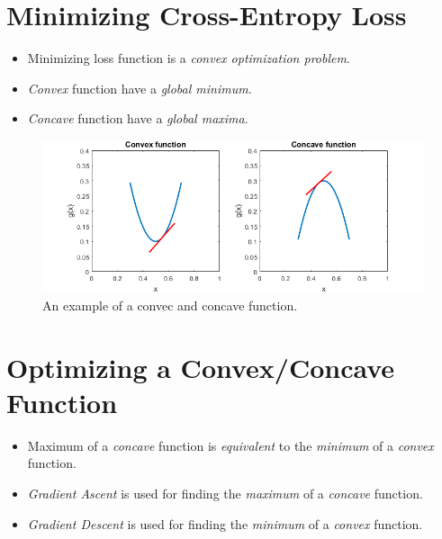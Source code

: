 \documentclass[
	number={4},
	title={Logistic Regression}
]{cs584notes}
\begin{document}
\section{Minimizing Cross-Entropy Loss}\label{sec:minimizing-cross-entropy-loss}
\begin{itemize}
	\item Minimizing loss function  is a \emph{convex optimization problem}.
	\item \emph{Convex } function have a \emph{global minimum}.
	\item \emph{Concave } function have a \emph{global maxima}.
\end{itemize}

\begin{figure}[H]
	\centering
	\includegraphics[width=\textwidth]{figures/4/concave_convex}
	\caption{An example of a convec and concave function.}
	\label{fig:concave-convex}
\end{figure}


\section{Optimizing a Convex/Concave Function}\label{sec:optimizing-a-convex/concave-function}
\begin{itemize}
	\item Maximum of a \emph{concave} function is \emph{equivalent} to the \emph{minimum} of a \emph{convex} function.
	\item \emph{Gradient Ascent} is used for finding the \emph{maximum} of a \emph{concave} function.
	\item \emph{Gradient Descent} is used for finding the \emph{minimum} of a \emph{convex} function.
\end{itemize}
\end{document}
